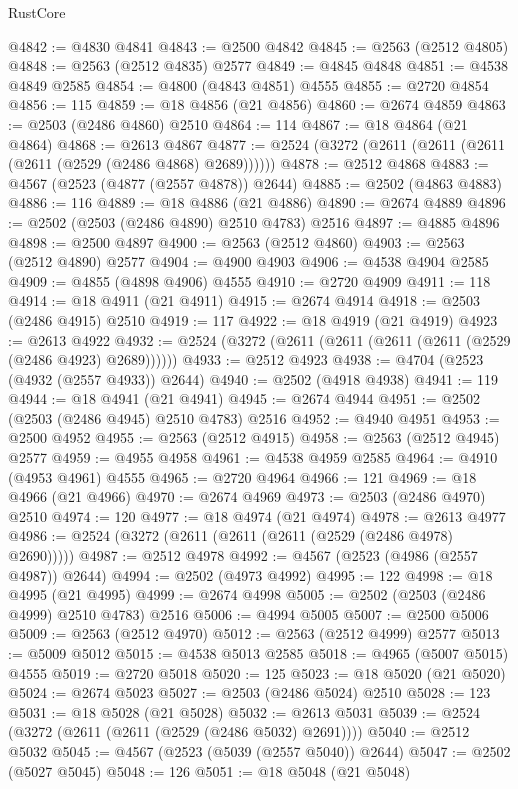 \begin{lexlean}{RustCore}
\begin{coremodule}
@4842 := @4830 @4841
@4843 := @2500 @4842
@4845 := @2563 (@2512 @4805)
@4848 := @2563 (@2512 @4835) @2577
@4849 := @4845 @4848
@4851 := @4538 @4849 @2585
@4854 := @4800 (@4843 @4851) @4555
@4855 := @2720 @4854
@4856 := 115
@4859 := @18 @4856 (@21 @4856)
@4860 := @2674 @4859
@4863 := @2503 (@2486 @4860) @2510
@4864 := 114
@4867 := @18 @4864 (@21 @4864)
@4868 := @2613 @4867
@4877 := @2524 (@3272 (@2611 (@2611 (@2611 (@2611 (@2529 (@2486 @4868) @2689))))))
@4878 := @2512 @4868
@4883 := @4567 (@2523 (@4877 (@2557 @4878)) @2644)
@4885 := @2502 (@4863 @4883)
@4886 := 116
@4889 := @18 @4886 (@21 @4886)
@4890 := @2674 @4889
@4896 := @2502 (@2503 (@2486 @4890) @2510 @4783) @2516
@4897 := @4885 @4896
@4898 := @2500 @4897
@4900 := @2563 (@2512 @4860)
@4903 := @2563 (@2512 @4890) @2577
@4904 := @4900 @4903
@4906 := @4538 @4904 @2585
@4909 := @4855 (@4898 @4906) @4555
@4910 := @2720 @4909
@4911 := 118
@4914 := @18 @4911 (@21 @4911)
@4915 := @2674 @4914
@4918 := @2503 (@2486 @4915) @2510
@4919 := 117
@4922 := @18 @4919 (@21 @4919)
@4923 := @2613 @4922
@4932 := @2524 (@3272 (@2611 (@2611 (@2611 (@2611 (@2529 (@2486 @4923) @2689))))))
@4933 := @2512 @4923
@4938 := @4704 (@2523 (@4932 (@2557 @4933)) @2644)
@4940 := @2502 (@4918 @4938)
@4941 := 119
@4944 := @18 @4941 (@21 @4941)
@4945 := @2674 @4944
@4951 := @2502 (@2503 (@2486 @4945) @2510 @4783) @2516
@4952 := @4940 @4951
@4953 := @2500 @4952
@4955 := @2563 (@2512 @4915)
@4958 := @2563 (@2512 @4945) @2577
@4959 := @4955 @4958
@4961 := @4538 @4959 @2585
@4964 := @4910 (@4953 @4961) @4555
@4965 := @2720 @4964
@4966 := 121
@4969 := @18 @4966 (@21 @4966)
@4970 := @2674 @4969
@4973 := @2503 (@2486 @4970) @2510
@4974 := 120
@4977 := @18 @4974 (@21 @4974)
@4978 := @2613 @4977
@4986 := @2524 (@3272 (@2611 (@2611 (@2611 (@2529 (@2486 @4978) @2690)))))
@4987 := @2512 @4978
@4992 := @4567 (@2523 (@4986 (@2557 @4987)) @2644)
@4994 := @2502 (@4973 @4992)
@4995 := 122
@4998 := @18 @4995 (@21 @4995)
@4999 := @2674 @4998
@5005 := @2502 (@2503 (@2486 @4999) @2510 @4783) @2516
@5006 := @4994 @5005
@5007 := @2500 @5006
@5009 := @2563 (@2512 @4970)
@5012 := @2563 (@2512 @4999) @2577
@5013 := @5009 @5012
@5015 := @4538 @5013 @2585
@5018 := @4965 (@5007 @5015) @4555
@5019 := @2720 @5018
@5020 := 125
@5023 := @18 @5020 (@21 @5020)
@5024 := @2674 @5023
@5027 := @2503 (@2486 @5024) @2510
@5028 := 123
@5031 := @18 @5028 (@21 @5028)
@5032 := @2613 @5031
@5039 := @2524 (@3272 (@2611 (@2611 (@2529 (@2486 @5032) @2691))))
@5040 := @2512 @5032
@5045 := @4567 (@2523 (@5039 (@2557 @5040)) @2644)
@5047 := @2502 (@5027 @5045)
@5048 := 126
@5051 := @18 @5048 (@21 @5048)

\end{coremodule}
\end{lexlean}
